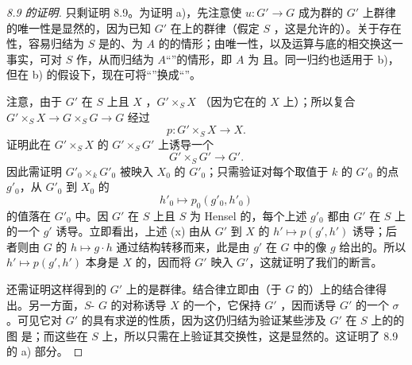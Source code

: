 \begin{proof}[8.9 的证明]
只剩证明 8.9。为证明 a)，先注意使 $u:G'\to G$ 成为群的 $G'$ 上群律的唯一性是显然的，因为已知 $G'$ 在上的群律（假定 $S$ ，这是允许的）。关于存在性，容易归结为 $S$ 是的、为 $A$ 的的情形；由唯一性，以及运算与底的相交换这一事实，可对 $S$ 作，从而归结为 $A$“”的情形，即 $A$ 为 且。同一归约也适用于 b)，但在 b) 的假设下，现在可将“”换成“”。

注意，由于 $G'$ 在 $S$ 上且 $X$ ，$G'\times_SX$ （因为它在的 $X$ 上）；所以复合 $G'\times_SX\to G\times_SG\to G$ 经过
\[p:G'\times_SX\longrightarrow X.\]
证明此在 $G'\times_SX$ 的 $G'\times_SG'$ 上诱导一个
\[G'\times_SG'\longrightarrow G'.\]
因此需证明 $G'_0\times_kG'_0$ 被映入 $X_0$ 的 $G'_0$；只需验证对每个取值于 $k$ 的 $G'_0$ 的点 $g'_0$，从 $G'_0$ 到 $X_0$ 的
\[h'_0\longmapsto p_0(g'_0,h'_0)\tag{x}\]
的值落在 $G'_0$ 中。因 $G'$ 在 $S$ 上且 $S$ 为 Hensel 的，每个上述 $g'_0$ 都由 $G'$ 在 $S$ 上的一个 $g'$ 诱导。立即看出，上述 (x) 由从 $G'$ 到 $X$ 的 $h'\mapsto p(g',h')$ 诱导；后者则由 $G$ 的 $h\mapsto g\cdot h$ 通过结构转移而来，此是由 $g'$ 在 $G$ 中的像 $g$ 给出的。所以 $h'\mapsto p(g',h')$ 本身是 $X$ 的，因而将 $G'$ 映入 $G'$，这就证明了我们的断言。

还需证明这样得到的 $G'$ 上的是群律。结合律立即由（于 $G$ 的）上的结合律得出。另一方面，$S$- $G$ 的对称诱导 $X$ 的一个，它保持 $G'$ ，因而诱导 $G'$ 的一个 $\sigma$。可见它对 $G'$ 的具有求逆的性质，因为这仍归结为验证某些涉及 $G'$ 在 $S$ 上的的图
是；而这些在 $S$ 上，所以只需在上验证其交换性，这是显然的。这证明了 8.9 的 a) 部分。


\end{proof}
